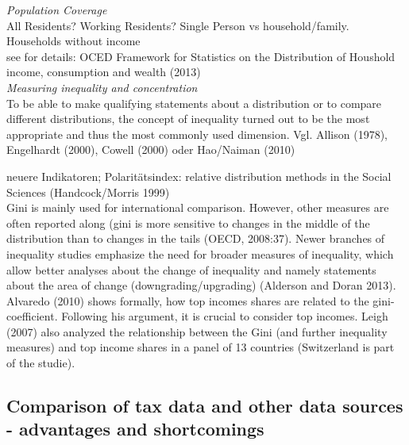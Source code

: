 \documentclass[twoside]{article}\usepackage[]{graphicx}\usepackage[]{color}
\begin{document}
\begin{multicols}{2}
\emph{Population Coverage} \\
All Residents? Working Residents? Single Person vs household/family. Households without income \\
see for details: OCED Framework for Statistics on the Distribution of Houshold income, consumption and wealth (2013) \\

\emph{Measuring inequality and concentration} \\
To be able to make qualifying statements about a distribution or to compare different distributions, the concept of inequality turned out to be the most appropriate and thus the most commonly used dimension. Vgl. Allison (1978), Engelhardt (2000), Cowell (2000) oder Hao/Naiman (2010)

neuere Indikatoren; Polaritätsindex: relative distribution methods in the Social Sciences (Handcock/Morris 1999) \\

Gini is mainly used for international comparison. However, other measures are often reported along (gini is more sensitive to changes in the middle of the distribution than to changes in the tails (OECD, 2008:37). Newer branches of inequality studies emphasize the need for broader measures of inequality, which allow better analyses about the change of inequality and namely statements about the area of change (downgrading/upgrading) (Alderson and Doran 2013). \\

Alvaredo (2010) shows formally, how top incomes shares are related to the gini-coefficient. Following his argument, it is crucial to consider top incomes. Leigh (2007) also analyzed the relationship between the Gini (and further inequality measures) and top income shares in a panel of 13 countries (Switzerland is part of the studie). 

\subsection{Comparison of tax data and other data sources - advantages and shortcomings}


\end{multicols}
\end{document}
